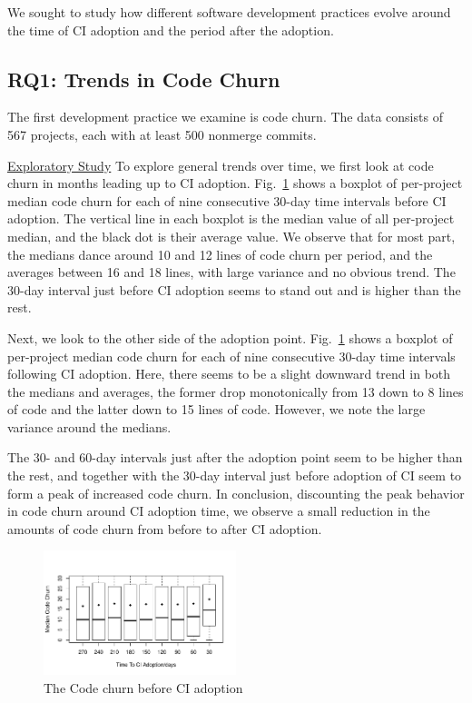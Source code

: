 \documentclass[conference]{IEEEtran}
\begin{document}
We sought to study how different software development practices evolve around the time of CI adoption and the period after the adoption.


\subsection{RQ1: Trends in Code Churn}

The first development practice we examine is code churn.
The data consists of 567 projects, each with at least 500 nonmerge commits.

\noindent \underline{Exploratory Study} To explore general trends over time, we first look at code churn in months leading up to CI adoption.
Fig.~\ref{Fig:CodeChurnBefore} shows a boxplot of per-project median code churn for each of nine consecutive 30-day time intervals before CI adoption.
The vertical line in each boxplot is the median value of all per-project median, and the black dot is their average value.
We observe that for most part, the medians dance around 
10 and 12 lines of code churn per period, and the averages between 16 and 18 lines, with large variance and no obvious trend. The 30-day interval just before CI adoption seems to stand out and is higher than the rest.

Next, we look to the other side of the adoption point. Fig.~\ref{Fig:CodeChurnBefore} shows a boxplot of per-project median code churn for each of nine consecutive 30-day time intervals following CI adoption.
Here,  there seems to be a slight downward trend in both the medians and averages, the former drop monotonically from 13 down to 8 lines of code and the latter down to 15 lines of code.
However, we note the large variance around the medians.

The 30- and 60-day intervals just after the adoption point seem to be higher than the rest, and together with the 30-day interval just before adoption of CI seem to form a peak of increased code churn.
In conclusion, discounting the peak behavior in code churn around CI adoption time, we observe a small reduction in the amounts of code churn from before to after CI adoption.


\begin{figure}[!t]
\centering
\includegraphics[width=0.5\textwidth]{churn_before.pdf}
\caption{The Code churn before CI adoption}
\label{Fig:CodeChurnBefore}
\end{figure}
\end{document}
